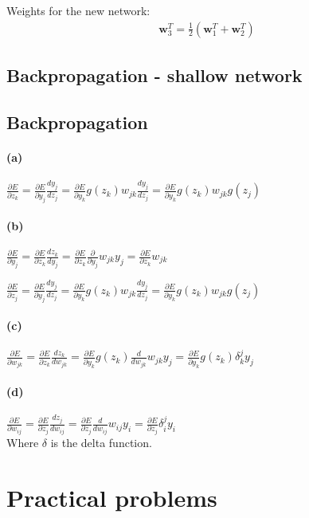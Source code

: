 \documentclass[a4paper,11pt]{article}
\begin{document}
	\noindent Weights for the new network:
	\begin{align*}
		\bm{w}_3^T=\frac{1}{2}(\bm{w}_1^T+\bm{w}_2^T)
	\end{align*} 
	
	\subsection{Backpropagation - shallow network}
	
	\subsection{Backpropagation}
	\paragraph{(a)}
	$\frac{\partial E}{\partial z_k} =\frac{\partial E}{\partial y_j} \frac{dy_j}{dz_j} = \frac{\partial E}{\partial y_k} g(z_k) w_{jk} \frac{dy_j}{dz_j} = \frac{\partial E}{\partial y_k} g(z_k) w_{jk} g(z_j)$
	\paragraph{(b)}
	$\frac{\partial E}{\partial y_j} =\frac{\partial E}{\partial z_k} \frac{dz_k}{dy_j} =
	\frac{\partial E}{\partial z_k} \frac{\partial}{\partial y_j} w_{jk} y_j =\frac{\partial E}{\partial z_k} w_{jk}$\par
	\setlength\parindent{1cm} $\frac{\partial E}{\partial z_j} = \frac{\partial E}{\partial y_j} \frac{dy_j}{dz_j} = \frac{\partial E}{\partial y_k} g(z_k) w_{jk} \frac{dy_j}{dz_j} = \frac{\partial E}{\partial y_k} g(z_k) w_{jk} g(z_j)$
	\paragraph{(c)}
	$\frac{\partial E}{\partial w_{jk}} = \frac{\partial E}{\partial z_k} \frac{dz_k}{dw_{jk}} = \frac{\partial E}{\partial y_k} g(z_k) \frac{d}{dw_{jk}} w_{jk}y_{j} = \frac{\partial E}{\partial y_k} g(z_k) \delta^j_k y_j$
	\paragraph{(d)}
	$\frac{\partial E}{\partial w_{ij}} = \frac{\partial E}{\partial z_j} \frac{dz_j}{dw_{ij}} = \frac{\partial E}{\partial z_j} \frac{d}{dw_{ij}} w_{ij}y_i = \frac{\partial E}{\partial z_j} \delta^j_i y_i$\\
	
	\noindent Where $\delta$ is the delta function.
	\section{Practical problems}
\end{document}

